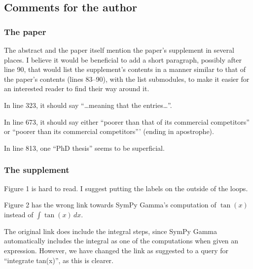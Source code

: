 \documentclass[answers,12pt]{exam}
\begin{document}
\subsection{Comments for the author}
\subsubsection{The paper}

\begin{questions}
\question The abstract and the paper itself mention the paper's supplement in several places. I believe it would be beneficial to add a short paragraph, possibly after line 90, that would list the supplement's contents in a manner similar to that of the paper's contents (lines 83--90), with the list submodules, to make it easier for an interested reader to find their way around it.
\begin{solution}

\end{solution}

\question In line 323, it should say ``\ldots meaning that the entries\ldots''.
\begin{solution}

\end{solution}

\question In line 673, it should say either ``poorer than that of its commercial competitors'' or ``poorer than its commercial competitors''' (ending in apostrophe).
\begin{solution}

\end{solution}

\question In line 813, one ``PhD thesis'' seems to be superficial.
\begin{solution}

\end{solution}

\subsubsection{The supplement}

\question Figure 1 is hard to read. I suggest putting the labels on the outside of the loops.
\begin{solution}

\end{solution}

\question Figure 2 has the wrong link towards SymPy Gamma's computation of $\tan(x)$
 instead of $\int \tan(x)\,dx$.
\begin{solution}
The original link does include the integral steps, since SymPy Gamma
automatically includes the integral as one of the computations when given an
expression. However, we have changed the link as suggested to a query for
``integrate tan(x)'', as this is clearer.
\end{solution}

\end{questions}
\end{document}
